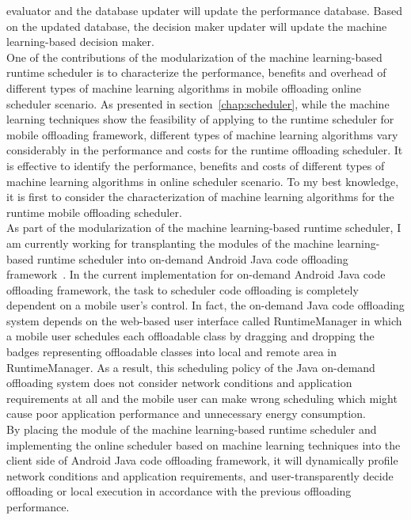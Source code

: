 evaluator and the database updater will update the performance database.
%
Based on the updated database, the decision maker updater will update
the machine learning-based decision maker.\\
%
One of the contributions of the modularization of the machine
learning-based runtime scheduler is to characterize the performance,
benefits and overhead of different types of machine learning algorithms
in mobile offloading online scheduler scenario.
%
As presented in section~\ref{chap:scheduler}, while the machine
learning techniques show the feasibility of applying to the runtime
scheduler for mobile offloading framework, different types of 
machine learning algorithms vary considerably in the performance 
and costs for the runtime offloading scheduler.
%
It is effective to identify the performance, benefits and costs of
different types of machine learning algorithms in online scheduler
scenario.
%
To my best knowledge, it is first to consider the characterization of
machine learning algorithms for the runtime mobile offloading
scheduler.\\
%
As part of the modularization of the machine learning-based runtime
scheduler, I am currently working for transplanting the modules of the
machine learning-based runtime scheduler into on-demand Android Java
code offloading framework~\cite{dpartner}.
%
In the current implementation for on-demand Android Java code offloading
framework, the task to scheduler code offloading is completely dependent
on a mobile user's control.
%
In fact, the on-demand Java code offloading system depends on the 
web-based user interface called RuntimeManager in which a mobile user
schedules each offloadable class by dragging and dropping the badges 
representing offloadable classes into local and remote area in 
RuntimeManager.
%
As a result, this scheduling policy of the Java on-demand offloading
system does not consider network conditions and application requirements
at all and the mobile user can make wrong scheduling which might cause
poor application performance and unnecessary energy consumption.\\
%
By placing the module of the machine learning-based runtime scheduler
and implementing the online scheduler based on machine learning
techniques into the client side of Android Java code offloading
framework, it will dynamically profile network conditions and
application requirements, and user-transparently decide offloading or
local execution in accordance with the previous offloading performance.
%
